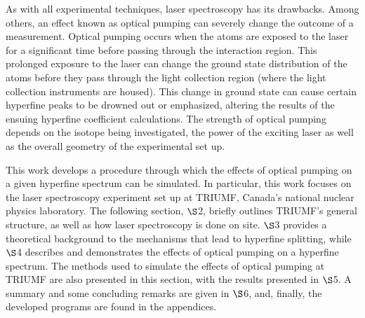 As with all experimental techniques, laser spectroscopy has its drawbacks. Among others, an effect known as optical pumping can severely change the outcome of a measurement. Optical pumping occurs when the atoms are exposed to the laser for a significant time before passing through the interaction region. This prolonged exposure to the laser can change the ground state distribution of the atoms before they pass through the light collection region (where the light collection instruments are housed). This change in ground state can cause certain hyperfine peaks to be drowned out or emphasized, altering the results of the ensuing hyperfine coefficient calculations. The strength of optical pumping depends on the isotope being investigated, the power of the exciting laser as well as the overall geometry of the experimental set up.

This work develops a procedure through which the effects of optical pumping on a given hyperfine spectrum can be simulated. In particular, this work focuses on the laser spectroscopy experiment set up at TRIUMF, Canada's national nuclear physics laboratory. The following section, $\S$2, briefly outlines TRIUMF's general structure, as well as how laser spectroscopy is done on site. $\S$3 provides a theoretical background to the mechanisms that lead to hyperfine splitting, while $\S$4 describes and demonstrates the effects of optical pumping on a hyperfine spectrum. The methods used to simulate the effects of optical pumping at TRIUMF are also presented in this section, with the results presented in $\S$5. A summary and some concluding remarks are given in $\S$6, and, finally, the developed programs are found in the appendices. 